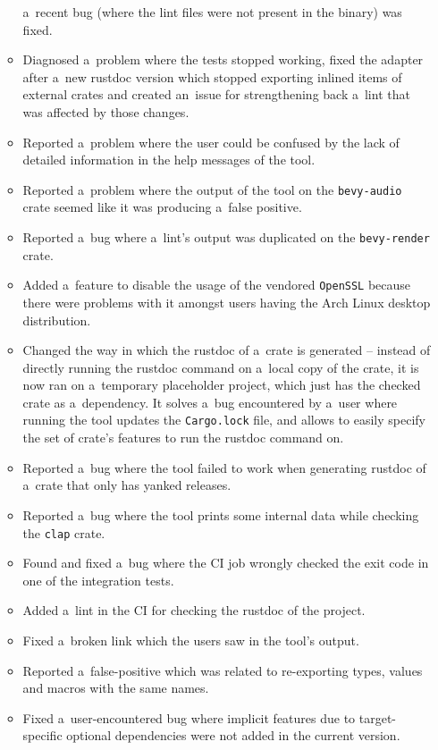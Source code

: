 \documentclass[licencjacka,en]{pracamgr}
\begin{document}
\begin{itemize}
\begin{itemize}
				a~recent bug (where the lint files were not present in the binary) was fixed.
			\item Diagnosed a~problem where the tests stopped working, fixed the adapter after
				a~new rustdoc version which stopped exporting inlined items of external crates
				and created an~issue for strengthening back a~lint that was affected
				by those changes.
			\item Reported a~problem where the user could be confused by the lack of detailed
				information in the help messages of the tool.
			\item Reported a~problem where the output of the tool on the \texttt{bevy-audio} crate
				seemed like it was producing a~false positive.
			\item Reported a~bug where a~lint's output was duplicated on the
				\texttt{bevy-render} crate.
			\item Added a~feature to disable the usage of the vendored \texttt{OpenSSL} because
				there were problems with it amongst users having the Arch Linux
				desktop distribution.
			\item Changed the way in which the rustdoc of a~crate is generated -- instead of
				directly running the rustdoc command on a~local copy of the crate, it is now ran
				on a~temporary placeholder project, which just has the checked crate as
				a~dependency. It solves a~bug encountered by a~user where running the tool updates
				the \texttt{Cargo.lock} file, and allows to easily specify the set of
				crate's features to run the rustdoc command on.
			\item Reported a~bug where the tool failed to work when generating rustdoc of a~crate
				that only has yanked releases.
			\item Reported a~bug where the tool prints some internal data while checking
				the \texttt{clap} crate.
			\item Found and fixed a~bug where the CI job wrongly checked the exit code in one
				of the integration tests.
			\item Added a~lint in the CI for checking the rustdoc of the project.
			\item Fixed a~broken link which the users saw in the tool's output.
			\item Reported a~false-positive which was related to re-exporting types, values
				and macros with the same names.
			\item Fixed a~user-encountered bug where implicit features due to target-specific
				optional dependencies were not added in the current version.

\end{itemize}
\end{itemize}
\end{document}
